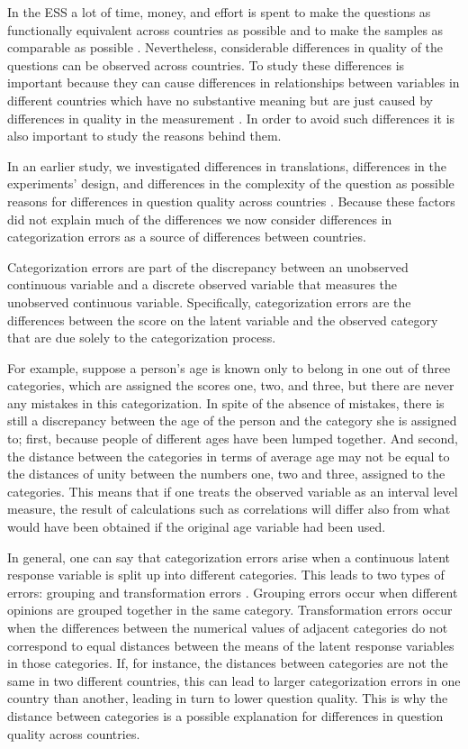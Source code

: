 \documentclass[a4paper,12pt]{article}
\begin{document}
In the ESS a lot of time, money, and effort is spent to make the questions as functionally equivalent across countries as possible \citep{harkness_cross-cultural_2002} and to make the samples as comparable as possible \citep{hader_2007}\nocite{jowell_measuring_2007}. Nevertheless, considerable differences in quality of the questions can be observed across countries. To study these differences is important because they can cause differences in relationships between variables in different countries which have no substantive meaning but are just caused by differences in quality in the measurement \citep{Saris_design_2007}. In order to avoid such differences it is also important to study the reasons behind them.

In an earlier study, we investigated differences in translations, differences in the experiments' design, and differences in the complexity of the question as possible reasons for differences in question quality across countries \citep*{oberski_differences_}. Because these factors did not explain much of the differences we now consider differences in categorization errors as a source of differences between countries. 

Categorization errors are part of the discrepancy between an unobserved continuous variable and a discrete observed variable that measures the unobserved continuous variable. Specifically, categorization errors are the differences between the score on the latent variable and the observed category that are due solely to the categorization process. 

For example, suppose a person's age is known only to belong in one out of three categories, which are assigned the scores one, two, and three, but there are never any mistakes in this categorization. In spite of the absence of mistakes, there is still a discrepancy between the age of the person and the category she is assigned to; first, because people of different ages have been lumped together.  And second, the distance between the categories in terms of average age may not be equal to the distances of unity between the numbers one, two and three, assigned to the categories. This means that if one treats the observed variable as an interval level measure, the result of calculations such as correlations will differ also from what would have been obtained if the original age variable had been used. 

In general, one can say that categorization errors arise when a continuous latent response variable is split up into different categories. This leads to two types of errors: grouping and transformation errors \citep{johnson_ordinal_1983}. Grouping errors occur when different opinions are grouped together in the same category. Transformation errors occur when the differences between the numerical values of adjacent categories do not correspond to equal distances between the means of the latent response variables in those categories. If, for instance, the distances between categories are not the same in two different countries, this can lead to larger categorization errors in one country than another, leading in turn to lower question quality. This is why the distance between categories is a possible explanation for differences in question quality across countries.
\end{document}
